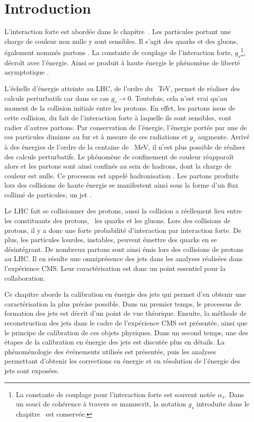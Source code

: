 \section{Introduction}\label{chapter-JERC-section-introduction}
L'interaction forte est abordée dans le chapitre~.
Les particules portant une charge de couleur non nulle y sont sensibles.
Il s'agit des quarks et des gluons, également nommés \og partons \fg.
La constante de couplage de l'interaction forte, $g_s$\footnote{La constante de couplage pour l'interaction forte est souvent notée $\alpha_s$. Dans un souci de cohérence à travers ce manuscrit, la notation $g_s$ introduite dans le chapitre~ est conservée.}, décroît  avec l'énergie.
Ainsi se produit à haute énergie le phénomène de \og liberté asymptotique \fg.
\par L'échelle d'énergie atteinte au LHC, de l'ordre du \SI{}{\TeV}, permet de réaliser des calculs perturbatifs car dans ce cas $g_s \to 0$. Toutefois, cela n'est vrai qu'au moment de la collision initiale entre les protons.
En effet, les partons issus de cette collision, du fait de l'interaction forte à laquelle ils sont sensibles, vont radier d'autres partons.
Par conservation de l'énergie, l'énergie portée par une de ces particules diminue au fur et à mesure de ces radiations et $g_s$ augmente.
Arrivé à des énergies de l'ordre de la centaine de \SI{}{\MeV}, il n'est plus possible de réaliser des calculs perturbatifs.
Le phénomène de confinement de couleur réapparaît alors et les partons sont ainsi confinés au sein de hadrons, dont la charge de couleur est nulle.
Ce processus est appelé \og hadronisation \fg.
Les partons produits lors des collisions de haute énergie se manifestent ainsi sous la forme d'un flux collimé de particules, un \og jet \fg.
\par Le LHC fait se collisionner des protons, aussi la collision a réellement lieu entre les constituants des protons, \ie\ les quarks et les gluons.
Lors des collisions de protons, il y a donc une forte probabilité d'interaction par interaction forte.
De plus, les particules lourdes, instables, peuvent émettre des quarks en se désintégrant.
De nombreux partons sont ainsi émis lors des collisions de protons au LHC.
Il en résulte une omniprésence des jets dans les analyses réalisées dans l'expérience CMS.
Leur caractérisation est donc un point essentiel pour la collaboration.
\par Ce chapitre aborde la calibration en énergie des jets qui permet d'en obtenir une caractérisation la plus précise possible.
Dans un premier temps, le processus de formation des jets est décrit d'un point de vue théorique. Ensuite, la méthode de reconstruction des jets dans le cadre de l'expérience CMS est présentée, ainsi que le principe de calibration de ces objets physiques.
Dans un second temps, une des étapes de la calibration en énergie des jets est discutée plus en détails. La phénoménologie des événements utilisés est présentée, puis les analyses permettant d'obtenir les corrections en énergie et en résolution de l'énergie des jets sont exposées.